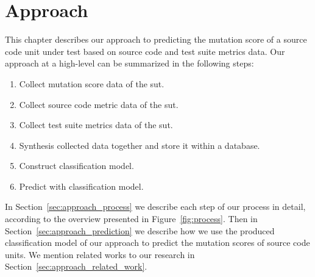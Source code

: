 \chapter{Approach}
\label{chap:approach}
This chapter describes our approach to predicting the mutation score of a source code unit under test based on source code and test suite metrics data. Our approach at a high-level can be summarized in the following steps:

\begin{enumerate}
  \item Collect mutation score data of the \gls{sut}.
  \item Collect source code metric data of the \gls{sut}.
  \item Collect test suite metrics data of the \gls{sut}.
  \item Synthesis collected data together and store it within a database.
  \item Construct classification model.
  \item Predict with classification model.
\end{enumerate}

In Section~\ref{sec:approach_process} we describe each step of our process in detail, according to the overview presented in Figure~\ref{fig:process}. Then in Section~\ref{sec:approach_prediction} we describe how we use the produced classification model of our approach to predict the mutation scores of source code units. We mention related works to our research in Section~\ref{sec:approach_related_work}.

